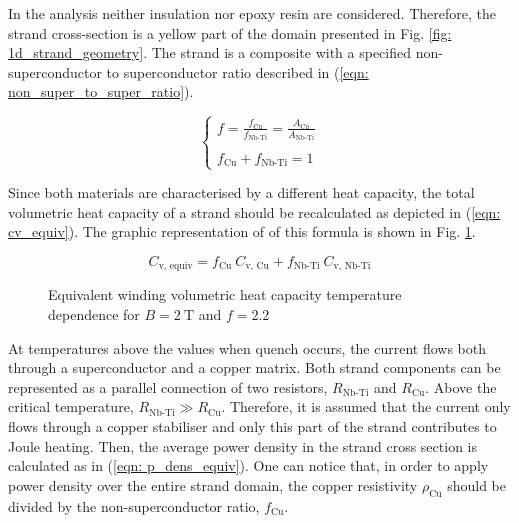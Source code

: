 
In the  analysis neither insulation nor epoxy resin are considered. Therefore, the strand cross-section is a yellow part of the domain presented in Fig. \ref{fig: 1d_strand_geometry}. The strand is a composite with a specified non-superconductor to superconductor ratio described in (\ref{eqn: non_super_to_super_ratio}).

\begin{equation}
    \left\{ \begin{array}{ll}
    f = \frac{f_\text{Cu}}{f_\text{Nb-Ti}} = \frac{A_\text{Cu}}{A_\text{Nb-Ti}}\\ \\
    f_\text{Cu} + f_\text{Nb-Ti} = 1
    \end{array} \right.
    \label{eqn: non_super_to_super_ratio}
\end{equation}

Since both materials are characterised by a different heat capacity, the total volumetric heat capacity of a strand should be recalculated as depicted in (\ref{eqn: cv_equiv}). The graphic representation of of this formula is shown in Fig. \ref{fig:eq_wind_cp}.

\begin{equation}
    C_\text{v, equiv} = f_\text{Cu} ~ C_\text{v, Cu} + f_\text{Nb-Ti} ~ C_\text{v, Nb-Ti}
    \label{eqn: cv_equiv}
\end{equation}

\begin{figure}[h!]
\centering
    \caption{Equivalent winding volumetric heat capacity temperature dependence for $B=2~\text{T}$ and $f=2.2$}
    \label{fig:eq_wind_cp}
\end{figure}

At temperatures above the values when quench occurs, the current flows both through a superconductor and a copper matrix. Both strand components can be represented as a parallel connection of two resistors, $R_\text{Nb-Ti}$ and $R_\text{Cu}$. Above the critical temperature, $R_\text{Nb-Ti} \gg R_\text{Cu}$. Therefore, it is assumed that the current only flows through a copper stabiliser and only this part of the strand contributes to Joule heating. Then, the average power density in the strand cross section is calculated as in (\ref{eqn: p_dens_equiv}). One can notice that, in order to apply power density over the entire strand domain, the copper resistivity $\rho_\text{Cu}$ should be divided by the non-superconductor ratio, $f_\text{Cu}$.


